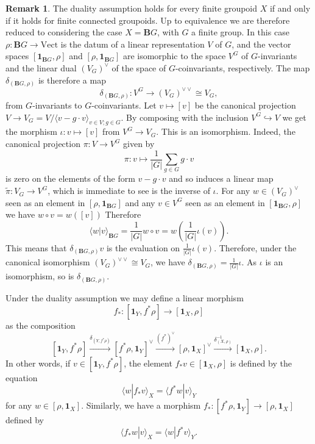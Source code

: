 \documentclass[12pt]{scrartcl}
\theoremstyle{definition}
\newtheorem{remark}[definition]{Remark}
\numberwithin{equation}{section}
\numberwithin{definition}{section}
\numberwithin{figure}{section}
\begin{document}
\begin{remark}
The duality assumption holds for every finite groupoid $X$ if and only if it holds for finite connected groupoids. Up to equivalence we are therefore reduced to considering the case $X=\mathbf{B}G$, with $G$ a finite group. In this case $\rho\colon \mathbf{B}G\to \mathrm{Vect}$ is the datum of a linear representation $V$ of $G$, and the vector spaces $[\mathbf{1}_{\mathbf{B}G},\rho]$ and $[\rho,\mathbf{1}_{\mathbf{B}G}]$ are isomorphic to the space $V^G$ of $G$-invariants and the linear dual $(V_G)^\vee$ of the space of $G$-coinvariants, respectively. The map $\delta_{(\mathbf{B}G,\rho)}$ is therefore a map
\[
\delta_{(\mathbf{B}G,\rho)}\colon V^G\to (V_G)^{\vee\vee}\cong V_G,
\]
from $G$-invariants to $G$-coinvariants. Let $v\mapsto [v]$ be the canonical projection $V\to V_G=V/\langle v-g\cdot v\rangle_{v\in V;g\in G}$. By composing with the inclusion $V^G\hookrightarrow V$ we get the morphism $\iota\colon v\mapsto [v]$ from $V^G\to V_G$. This is an isomorphism. Indeed, the canonical projection $\pi\colon V\to V^G$ given by
\[
\pi\colon v\mapsto \frac{1}{|G|}\sum_{g\in G} g\cdot v
\]
is zero on the elements of the form $v-g\cdot v$ and so induces a linear map $\tilde{\pi}\colon V_G\to V^G$, which is immediate to see is the inverse of $\iota$.
For any $w\in (V_G)^\vee$ seen as an element in $[\rho,\mathbf{1}_{\mathbf{B}G}]$ and any $v\in V^G$ seen as an element in $[\mathbf{1}_{\mathbf{B}G},\rho]$ we have $w\circ v =w([v])$ Therefore
\[
\langle w| v\rangle_{\mathbf{B}G}=\frac{1}{|G|}w\circ v=w\left(\frac{1}{|G|}\iota(v)\right).
\]
This means that $\delta_{(\mathbf{B}G,\rho)}v$ is the evaluation on $\frac{1}{|G|}\iota(v)$. Therefore, under the canonical isomorphism $(V_G)^{\vee\vee}\cong V_G$, we have $\delta_{(\mathbf{B}G,\rho)}=\frac{1}{|G|}\iota$. As $\iota$ is an isomorphism, so is $\delta_{(\mathbf{B}G,\rho)}$.
\end{remark}

Under the duality assumption we may define a linear morphism 
\[
f_*\colon [\mathbf{1}_Y,f^*\rho]\to  [\mathbf{1}_X,\rho]
\]
as the composition
\[
[\mathbf{1}_Y,f^*\rho]\xrightarrow{\delta_{(Y,f^*\rho)}}[f^*\rho,\mathbf{1}_Y]^\vee \xrightarrow{(f^*)^\vee} [\rho,\mathbf{1}_X]^\vee \xrightarrow{\delta_{(X,\rho)}^{-1}} [\mathbf{1}_X,\rho].
\]
In other words, if $v\in [\mathbf{1}_Y,f^*\rho]$, the element $f_*v\in [\mathbf{1}_X,\rho]$ is defined 
 by the equation
\[
\langle w| f_*v\rangle_X = \langle f^*w| v\rangle_Y
\]
for any $w\in [\rho,\mathbf{1}_X]$. Similarly, we have a morphism $f_*\colon [f^*\rho,\mathbf{1}_Y]\to [\rho,\mathbf{1}_X]$ defined by
\[
\langle f_*w| v\rangle_X = \langle w| f^*v\rangle_Y.
\]
\end{document}
